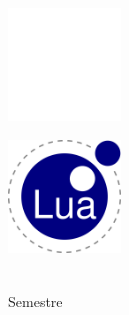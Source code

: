 {\selectfont

\begin{center}

    \begin{minipage}{3.5cm}
    	\begin{center}
	    \includegraphics[width=3cm]{resources/Logo_Universidad.png}
    	\end{center}
    \end{minipage}
    \hfill
    \begin{minipage}{3.5cm}
    	\begin{center}
    	\includegraphics[width=3cm]{resources/Logo_Facultad.png}
    	\end{center}
    \end{minipage}

    \vspace{0.5cm}
    
    {\scshape
        {\LARGE \color{Variante6}
        }
        
        \vspace{0.25cm}
        
        {\huge \color{Variante4}
        }
    
        {\LARGE \color{Variante7}
             \\
            Semestre 
        }
    
        \vspace{0.35cm}
    
        {\LARGE \color{Variante5}
        }
        
}
\end{center}}
